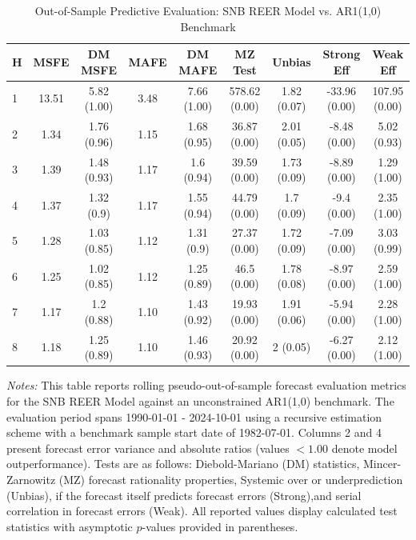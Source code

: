 \begin{table}[htbp]
\centering
\caption{Out-of-Sample Predictive Evaluation: SNB REER Model vs. AR1(1,0) Benchmark}
\label{tab:snb_reer_model_evaluation}
\footnotesize
\begin{tabular}{l cccccccc}
\hline\hline
\rule{0pt}{3ex}
\textbf{H} & \textbf{MSFE} & \textbf{DM MSFE} & \textbf{MAFE} & \textbf{DM MAFE} & \textbf{MZ Test} & \textbf{Unbias} & \textbf{Strong Eff} & \textbf{Weak Eff} \\[0.5ex]
\hline
\rule{0pt}{2.5ex}
1 & 13.51 & 5.82 (1.00) & 3.48 & 7.66 (1.00) & 578.62 (0.00) & 1.82 (0.07) & -33.96 (0.00) & 107.95 (0.00) \\
2 & 1.34 & 1.76 (0.96) & 1.15 & 1.68 (0.95) & 36.87 (0.00) & 2.01 (0.05) & -8.48 (0.00) & 5.02 (0.93) \\
3 & 1.39 & 1.48 (0.93) & 1.17 & 1.6 (0.94) & 39.59 (0.00) & 1.73 (0.09) & -8.89 (0.00) & 1.29 (1.00) \\
4 & 1.37 & 1.32 (0.9) & 1.17 & 1.55 (0.94) & 44.79 (0.00) & 1.7 (0.09) & -9.4 (0.00) & 2.35 (1.00) \\
5 & 1.28 & 1.03 (0.85) & 1.12 & 1.31 (0.9) & 27.37 (0.00) & 1.72 (0.09) & -7.09 (0.00) & 3.03 (0.99) \\
6 & 1.25 & 1.02 (0.85) & 1.12 & 1.25 (0.89) & 46.5 (0.00) & 1.78 (0.08) & -8.97 (0.00) & 2.59 (1.00) \\
7 & 1.17 & 1.2 (0.88) & 1.10 & 1.43 (0.92) & 19.93 (0.00) & 1.91 (0.06) & -5.94 (0.00) & 2.28 (1.00) \\
8 & 1.18 & 1.25 (0.89) & 1.10 & 1.46 (0.93) & 20.92 (0.00) & 2 (0.05) & -6.27 (0.00) & 2.12 (1.00) \\
\hline\hline
\end{tabular}%
\par\smallskip
\parbox{\textwidth}{\scriptsize \textit{Notes:} This table reports rolling pseudo-out-of-sample forecast evaluation metrics for the SNB REER Model against an unconstrained AR1(1,0) benchmark. The evaluation period spans 1990-01-01 - 2024-10-01 using a recursive estimation scheme with a benchmark sample start date of 1982-07-01. Columns 2 and 4 present forecast error variance and absolute ratios (values $< 1.00$ denote model outperformance). Tests are as follows: Diebold-Mariano (DM) statistics, Mincer-Zarnowitz (MZ) forecast rationality properties, Systemic over or underprediction (Unbias), if the forecast itself predicts forecast errors (Strong),and serial correlation in forecast errors (Weak). All reported values display calculated test statistics with asymptotic $p$-values provided in parentheses.}
\end{table}
